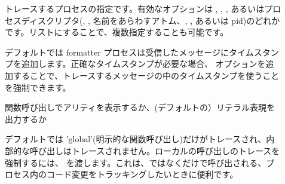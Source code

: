 \begin{description}
  \item[] \hfill
	
	トレースするプロセスの指定です。有効なオプションは , , , あるいはプロセスディスクリプタ(, , 名前をあらわすアトム、, , あるいは pid)のどれかです。リストにすることで、複数指定することも可能です。

  \item[] \hfill

デフォルトでは formatter プロセスは受信したメッセージにタイムスタンプを追加します。正確なタイムスタンプが必要な場合、 オプションを追加することで、トレースするメッセージの中のタイムスタンプを使うことを強制できます。

  \item[] \hfill

    関数呼び出しでアリティを表示するか、(デフォルトの）リテラル表現を出力するか

  \item[] \hfill

    デフォルトでは 'global'(明示的な関数呼び出し)だけがトレースされ、内部的な呼び出しはトレースされません。ローカルの呼び出しのトレースを強制するには、 を渡します。これは、ではなくだけで呼び出される、プロセス内のコード変更をトラッキングしたいときに便利です。

\end{description}

